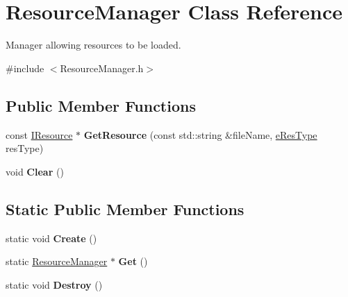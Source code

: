 \hypertarget{classResourceManager}{\section{Resource\-Manager Class Reference}
\label{classResourceManager}
}


Manager allowing resources to be loaded.  




{\ttfamily \#include $<$Resource\-Manager.\-h$>$}

\subsection*{Public Member Functions}
\begin{DoxyCompactItemize}
\item 
\hypertarget{classResourceManager_a1f2266bcc0ce4f928429fb1435f4c9ec}{const \hyperlink{classIResource}{I\-Resource} $\ast$ {\bfseries Get\-Resource} (const std\-::string \&file\-Name, \hyperlink{IResource_8h_ae4833ed8c638706caabde17caff26679}{e\-Res\-Type} res\-Type)}\label{classResourceManager_a1f2266bcc0ce4f928429fb1435f4c9ec}

\item 
\hypertarget{classResourceManager_aecd08b92634fad3316442c267a04e8c4}{void {\bfseries Clear} ()}\label{classResourceManager_aecd08b92634fad3316442c267a04e8c4}

\end{DoxyCompactItemize}
\subsection*{Static Public Member Functions}
\begin{DoxyCompactItemize}
\item 
\hypertarget{classResourceManager_a0eccd72b4e67797ec0292c94274e8179}{static void {\bfseries Create} ()}\label{classResourceManager_a0eccd72b4e67797ec0292c94274e8179}

\item 
\hypertarget{classResourceManager_aa9e162b833ee6b940d50a12233e5e461}{static \hyperlink{classResourceManager}{Resource\-Manager} $\ast$ {\bfseries Get} ()}\label{classResourceManager_aa9e162b833ee6b940d50a12233e5e461}

\item 
\hypertarget{classResourceManager_ade26e23be6dbfda310c46a783f92e4b1}{static void {\bfseries Destroy} ()}\label{classResourceManager_ade26e23be6dbfda310c46a783f92e4b1}

\end{DoxyCompactItemize}


